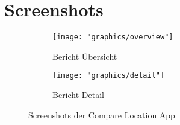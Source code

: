 \section{Screenshots}

\begin{figure}[ht]
	\centering
	\begin{subfigure}{.4\textwidth}
		\centering
		\texttt{[image: "graphics/overview"]}
		\caption{Bericht Übersicht}
	\end{subfigure}
	\begin{subfigure}{.4\textwidth}
		\centering
		\texttt{[image: "graphics/detail"]}
		\caption{Bericht Detail}
	\end{subfigure}
	\caption{Screenshots der Compare Location App}
\end{figure}
